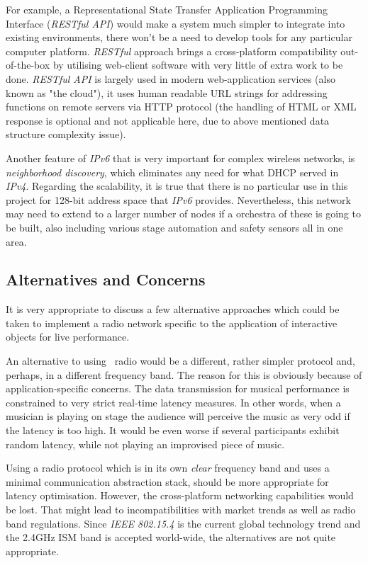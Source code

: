  For example, a Representational State Transfer Application Programming
 Interface (\emph{RESTful API}) \cite{links:wiki:rest} would make a
 system much simpler to integrate into existing environments,
 there won't be a need to develop tools for any particular computer platform.
 \emph{RESTful} approach brings a cross-platform compatibility out-of-the-box
 by utilising web-client software with very little of extra work to be done.
 \emph{RESTful API} is largely used in modern web-application services
 (also known as "the cloud"), it uses human readable URL strings for
 addressing functions on remote servers via HTTP protocol (the handling
 of HTML or XML response is optional and not applicable here, due to above
 mentioned data structure complexity issue).

 Another feature of \emph{IPv6} that is very important for complex wireless
 networks, is \emph{neighborhood discovery}, which eliminates any need
 for what DHCP served in \emph{IPv4}. Regarding the scalability,
 it is true that there is no particular use in this project for 128-bit
 address space that \emph{IPv6} provides. Nevertheless, this network
 may need to extend to a larger number of nodes if a orchestra of these
 is going to be built, also including various stage automation and
 safety sensors all in one area.


\subsection{Alternatives and Concerns}

  It is very appropriate to discuss a few alternative approaches which
 could be taken to implement a radio network specific to the application
 of interactive objects for live performance.

  An alternative to using \WPAN\ radio would be a different, rather
 simpler protocol and, perhaps, in a different frequency band.
  The reason for this is obviously because of application-specific
 concerns. The data transmission for musical performance is constrained
 to very strict real-time latency measures. In other words, when a
 musician is playing on stage the audience will perceive the music as
 very odd if the latency is too high. It would be even worse if several
 participants exhibit random latency, while not playing an improvised
 piece of music.

  Using a radio protocol which is in its own \emph{clear} frequency
 band and uses a minimal communication abstraction stack, should be
 more appropriate for latency optimisation. However, the cross-platform
 networking capabilities would be lost. That might lead to incompatibilities
 with market trends as well as radio band regulations.
  Since \emph{IEEE 802.15.4} is the current global technology trend and
 the 2.4GHz ISM band is accepted world-wide, the alternatives are not
 quite appropriate.

